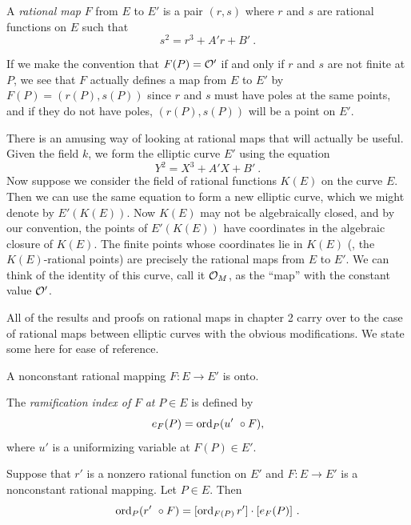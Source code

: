 \begin{defi}
\label{d2.1.1}
A {\it rational map} $F$ from $E$ to $E'$ is a pair $(r,s)$ where $r$ and $s$ are rational functions on $E$ such that
$$
s^{2}=r^{3}+A'r+B'\ .
$$
\end{defi}
If we make the convention that $F(P)=\mathcal{O}'$ if and only if $r$ and $s$ are not finite at $P$, we see that $F$ actually defines a map from $E$ to $E'$ by $F(P)=(r(P),s(P))$ since $r$ and $s$ must have poles at the same points, and if they do not have poles, $(r(P),s(P))$ will be a point on $E'$.

\rem
There is an amusing way of looking at rational maps that will actually be useful. Given the field $k$, we form the elliptic curve $E'$ using the equation
\begin{equation}
\label{eq2.1}
Y^{2}=X^{3}+A'X+B'\ .
\end{equation}
Now suppose we consider the field of rational functions $K(E)$ on the curve $E$. Then we can use the same equation to form a new elliptic curve, which we might denote by $E'(K(E))$. Now $K(E)$ may not be algebraically closed, and by our convention, the points of $E'(K(E))$ have coordinates in the algebraic closure of $K(E)$. The finite points whose coordinates lie in $K(E)$ (\ie, the $K(E)$-rational points) are precisely the rational maps from $E$ to $E'$. We can think of the identity of this curve, call it $\mathcal{O}_{M}$, as the ``map'' with the constant value $\mathcal{O}'$.

All of the results and proofs on rational maps in chapter 2 carry over to the case of rational maps between elliptic curves with the obvious modifications. We state some here for ease of reference.

\begin{prop}
\label{p2.1.1}
A nonconstant rational mapping $F:E\rightarrow E'$ is onto.
\end{prop}

\begin{defi}
\label{d2.1.2}
The {\it ramification index of} $F$ {\it at} $P\in E$ is defined by
$$
e_{F}(P)=\operatorname{ord}_{P}(u'\ \circ F),
$$
where $u'$ is a uniformizing variable at $F(P)\in E'$.
\end{defi}

\begin{prop}
\label{p2.1.2}
Suppose that $r'$ is a nonzero rational function on $E'$ and $F:E\rightarrow E'$ is a nonconstant rational mapping. Let $P\in E$. Then
$$
\operatorname{ord}_{P}(r'\ \circ F)=[\operatorname{ord}_{F(P)}r']\cdot[e_{F}(P)]\ .
$$
\end{prop}

